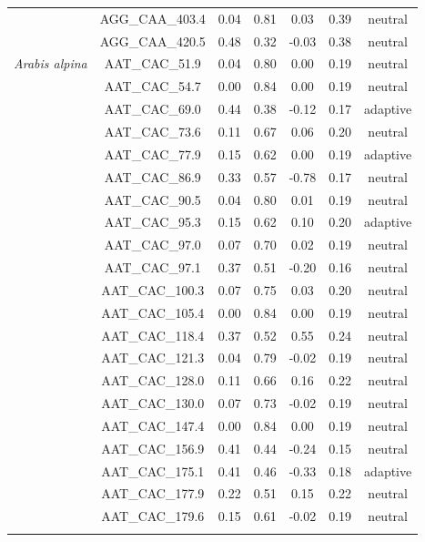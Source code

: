 \documentclass[11pt,]{article}
\begin{document}
\begin{longtable}[c]{@{}lcccccc@{}}
& AGG\_CAA\_403.4 & 0.04 & 0.81 & 0.03 & 0.39 & neutral
\\\addlinespace
& AGG\_CAA\_420.5 & 0.48 & 0.32 & -0.03 & 0.38 & neutral
\\\addlinespace
\textit{Arabis alpina} & AAT\_CAC\_51.9 & 0.04 & 0.80 & 0.00 & 0.19 &
neutral
\\\addlinespace
& AAT\_CAC\_54.7 & 0.00 & 0.84 & 0.00 & 0.19 & neutral
\\\addlinespace
& AAT\_CAC\_69.0 & 0.44 & 0.38 & -0.12 & 0.17 & adaptive
\\\addlinespace
& AAT\_CAC\_73.6 & 0.11 & 0.67 & 0.06 & 0.20 & neutral
\\\addlinespace
& AAT\_CAC\_77.9 & 0.15 & 0.62 & 0.00 & 0.19 & adaptive
\\\addlinespace
& AAT\_CAC\_86.9 & 0.33 & 0.57 & -0.78 & 0.17 & neutral
\\\addlinespace
& AAT\_CAC\_90.5 & 0.04 & 0.80 & 0.01 & 0.19 & neutral
\\\addlinespace
& AAT\_CAC\_95.3 & 0.15 & 0.62 & 0.10 & 0.20 & adaptive
\\\addlinespace
& AAT\_CAC\_97.0 & 0.07 & 0.70 & 0.02 & 0.19 & neutral
\\\addlinespace
& AAT\_CAC\_97.1 & 0.37 & 0.51 & -0.20 & 0.16 & neutral
\\\addlinespace
& AAT\_CAC\_100.3 & 0.07 & 0.75 & 0.03 & 0.20 & neutral
\\\addlinespace
& AAT\_CAC\_105.4 & 0.00 & 0.84 & 0.00 & 0.19 & neutral
\\\addlinespace
& AAT\_CAC\_118.4 & 0.37 & 0.52 & 0.55 & 0.24 & neutral
\\\addlinespace
& AAT\_CAC\_121.3 & 0.04 & 0.79 & -0.02 & 0.19 & neutral
\\\addlinespace
& AAT\_CAC\_128.0 & 0.11 & 0.66 & 0.16 & 0.22 & neutral
\\\addlinespace
& AAT\_CAC\_130.0 & 0.07 & 0.73 & -0.02 & 0.19 & neutral
\\\addlinespace
& AAT\_CAC\_147.4 & 0.00 & 0.84 & 0.00 & 0.19 & neutral
\\\addlinespace
& AAT\_CAC\_156.9 & 0.41 & 0.44 & -0.24 & 0.15 & neutral
\\\addlinespace
& AAT\_CAC\_175.1 & 0.41 & 0.46 & -0.33 & 0.18 & adaptive
\\\addlinespace
& AAT\_CAC\_177.9 & 0.22 & 0.51 & 0.15 & 0.22 & neutral
\\\addlinespace
& AAT\_CAC\_179.6 & 0.15 & 0.61 & -0.02 & 0.19 & neutral
\\\addlinespace

\end{longtable}
\end{document}
